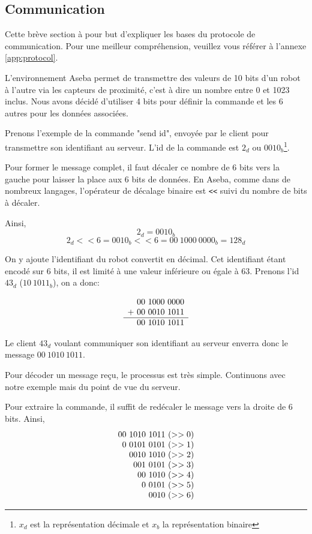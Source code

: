 \subsection{Communication}
\label{sec:communication}
Cette brève section à pour but d'expliquer les bases du protocole de communication. Pour une meilleur compréhension, veuillez vous référer à l'annexe \ref{app:protocol}.

L'environnement Aseba permet de transmettre des valeurs de 10 bits d'un robot à l'autre via les capteurs de proximité, c'est à dire un nombre entre 0 et 1023 inclus.
Nous avons décidé d'utiliser 4 bits pour définir la commande et les 6 autres pour les données associées.

Prenons l'exemple de la commande "send id", envoyée par le client pour transmettre son identifiant au serveur. L'id de la commande est $2_d$ ou $0010_b$\footnote{$x_d$ est la représentation décimale et $x_b$ la représentation binaire}.

Pour former le message complet, il faut décaler ce nombre de 6 bits vers la gauche pour laisser la place aux 6 bits de données. En Aseba, comme dans de nombreux langages, l'opérateur de décalage binaire est \texttt{<<} suivi du nombre de bits à décaler.

Ainsi,
\[ 2_d = 0010_b \]
\[ 2_d << 6 = 0010_b << 6 = 00\ 1000\ 0000_b = 128_d \]

On y ajoute l'identifiant du robot convertit en décimal. Cet identifiant étant encodé sur 6 bits, il est limité à une valeur inférieure ou égale à 63. Prenons l'id $43_d$ ($10\ 1011_b$), on a donc:

\[\begin{array}[t]{r}
   00\ 1000\ 0000 \\
+\ 00\ 0010\ 1011 \\ \hline
   00\ 1010\ 1011
\end{array}
\]

Le client $43_d$ voulant communiquer son identifiant au serveur enverra donc le message $00\ 1010\ 1011$.

Pour décoder un message reçu, le processus est très simple. Continuons avec notre exemple mais du point de vue du serveur.

Pour extraire la commande, il suffit de redécaler le message vers la droite de 6 bits. Ainsi,
\[\begin{array}[t]{r}
   00\ 1010\ 1011\ (>> 0)\\
    0\ 0101\ 0101\ (>> 1)\\
       0010\ 1010\ (>> 2)\\
        001\ 0101\ (>> 3)\\
         00\ 1010\ (>> 4)\\
          0\ 0101\ (>> 5)\\
             0010\ (>> 6)
\end{array}
\]

